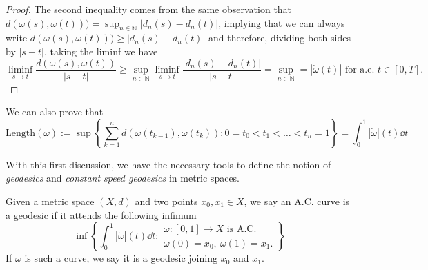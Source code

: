 \begin{proof}
	The second inequality comes from the same observation that $d(\omega(s), \omega(t))) 
	= \sup_{n \in \mathbb{N}} |d_n(s) - d_n(t)|$, implying that we can always write $d(\omega(s), \omega(t))) 
	\ge |d_n(s) - d_n(t)|$ and therefore, dividing both sides by $|s - t|$, taking the liminf we have 
	\begin{equation*}
		\liminf_{s \to t} \frac{d(\omega(s), \omega(t))}{|s - t|} \ge \sup_{n \in \mathbb{N}} \liminf_{s \to t} \frac{|d_n(s) - d_n(t)|}{|s - t|} = \sup_{n \in \mathbb{N}} = |\dot{\omega}(t)| \text{ for a.e. $t \in [0,T]$.}
	\end{equation*}
\end{proof}

We can also prove that 
\begin{equation}
\label{length}
\text{Length}(\omega) 
:= \sup
\left\{
\sum_{k = 1}^n d(\omega(t_{k -1}), \omega(t_{k})): 
0 = t_0 < t_1 < \dots < t_n = 1
\right\}
= \int_0^1|\dot{\omega}|(t)\dd t \end{equation}

With this first discussion, we have the necessary tools to define the notion of {\em geodesics} and {\em constant speed geodesics} in metric spaces. 

\begin{definition}
	\label{definition.geodesic}
	Given a metric space $(X,d)$ and two points $x_0, x_1 \in X$, we say an A.C. curve is a geodesic if it attends the following infimum 
	\begin{equation}
	\inf 
	\left\{
	\int_0^1 |\dot{\omega}|(t)\dd t: 
	\begin{array}{c}
	\omega :[0,1] \to X \text{ is A.C.}\\
	\omega(0) = x_0, \ \omega(1) = x_1.
	\end{array}
	\right\}
	\end{equation}
	If $\omega$ is such a curve, we say it is a geodesic joining $x_0$ and $x_1$. 
\end{definition}

